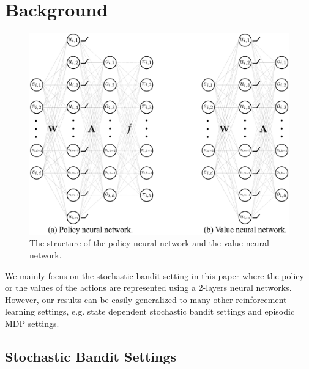 \section{Background}
\label{sec:background}

\begin{figure}[t]
	\begin{center}
		\centerline{\includegraphics[width=0.7\columnwidth]{nn_policy_value_vertical.pdf}}
		\caption{The structure of the policy neural network and the value neural network.}
		\label{fig:nn_policy_value}
	\end{center}
	\vskip -0.2in
\end{figure}

We mainly focus on the stochastic bandit setting in this paper where the policy or the values of the actions are represented using a 2-layers neural networks.  
However, our results can be easily generalized to many other reinforcement learning settings, e.g. state dependent stochastic bandit settings and episodic MDP settings.

\subsection{Stochastic Bandit Settings}
\label{subsec:settings}

